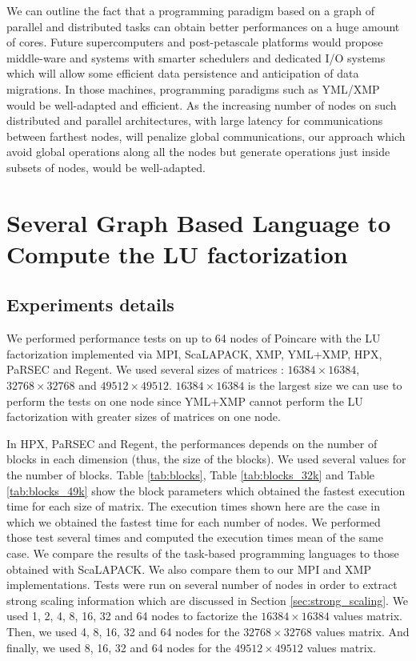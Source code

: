 We can outline the fact that a programming paradigm based on a graph of parallel and distributed tasks can obtain better performances on a huge amount of cores.
Future supercomputers and post-petascale platforms would propose middle-ware and systems with smarter schedulers \cite{EPPSA2016} and dedicated I/O systems \cite{HuMPC2011} which will allow some efficient data persistence and anticipation of data migrations.
In those machines, programming paradigms such as YML/XMP would be well-adapted and efficient.
As the increasing number of nodes on such distributed and parallel architectures, with large latency for communications between farthest nodes, will penalize global communications, our approach which avoid global operations along all the nodes but generate operations just inside subsets of nodes, would be well-adapted.


\section{Several Graph Based Language to Compute the LU factorization}
\subsection{Experiments details}
We performed performance tests on up to 64 nodes of Poincare with the LU factorization implemented via MPI, ScaLAPACK, XMP, YML+XMP, HPX, PaRSEC and Regent.
We used several sizes of matrices : $16384 \times 16384$, $32768 \times 32768$ and $49512 \times 49512$.
$16384 \times 16384$ is the largest size we can use to perform the tests on one node since YML+XMP cannot perform the LU factorization with greater sizes of matrices on one node.

In HPX, PaRSEC and Regent, the performances depends on the number of blocks in each dimension (thus, the size of the blocks).
We used several values for the number of blocks.
Table \ref{tab:blocks}, Table \ref{tab:blocks_32k} and Table \ref{tab:blocks_49k} show the block parameters which obtained the fastest execution time for each size of matrix.
The execution times shown here are the case in which we obtained the fastest time for each number of nodes.
We performed those test several times and computed the execution times mean of the same case.
We compare the results of the task-based programming languages to those obtained with ScaLAPACK.
We also compare them to our MPI and XMP implementations.
Tests were run on several number of nodes in order to extract strong scaling information which are discussed in Section \ref{sec:strong_scaling}.
We used  1, 2, 4, 8, 16, 32 and 64 nodes to factorize the $16384 \times 16384$ values matrix.
Then, we used 4, 8, 16, 32 and 64 nodes for the $32768 \times 32768$ values matrix.
And finally, we used 8, 16, 32 and 64 nodes for the $49512 \times 49512$ values matrix.

